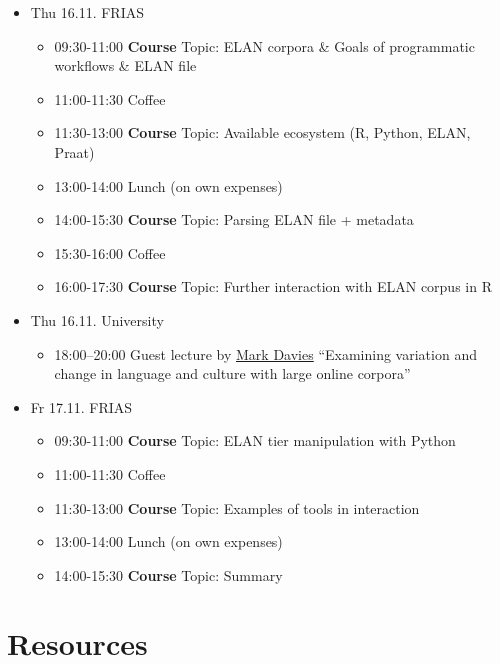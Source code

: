 \documentclass[]{book}
\providecommand{\tightlist}{%
  \setlength{\itemsep}{0pt}\setlength{\parskip}{0pt}}
\theoremstyle{definition}
\theoremstyle{definition}
\theoremstyle{definition}
\theoremstyle{remark}
\begin{document}
\begin{itemize}
\tightlist
\item
  Thu 16.11. FRIAS

  \begin{itemize}
  \tightlist
  \item
    09:30-11:00 \textbf{Course} Topic: ELAN corpora \& Goals of
    programmatic workflows \& ELAN file
  \item
    11:00-11:30 Coffee
  \item
    11:30-13:00 \textbf{Course} Topic: Available ecosystem (R, Python,
    ELAN, Praat)
  \item
    13:00-14:00 Lunch (on own expenses)
  \item
    14:00-15:30 \textbf{Course} Topic: Parsing ELAN file + metadata
  \item
    15:30-16:00 Coffee
  \item
    16:00-17:30 \textbf{Course} Topic: Further interaction with ELAN
    corpus in R
  \end{itemize}
\item
  Thu 16.11. University

  \begin{itemize}
  \tightlist
  \item
    18:00--20:00 Guest lecture by
    \href{https://en.wikipedia.org/wiki/Mark_Davies_(linguist)}{Mark
    Davies} ``Examining variation and change in language and culture
    with large online corpora''
  \end{itemize}
\item
  Fr 17.11. FRIAS

  \begin{itemize}
  \tightlist
  \item
    09:30-11:00 \textbf{Course} Topic: ELAN tier manipulation with
    Python
  \item
    11:00-11:30 Coffee
  \item
    11:30-13:00 \textbf{Course} Topic: Examples of tools in interaction
  \item
    13:00-14:00 Lunch (on own expenses)
  \item
    14:00-15:30 \textbf{Course} Topic: Summary
  \end{itemize}
\end{itemize}

\section{Resources}\label{resources}
\end{document}
